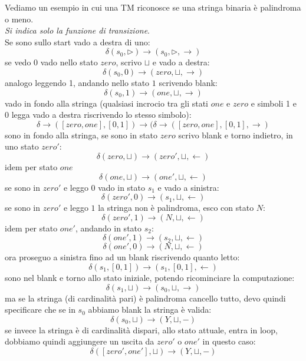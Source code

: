 \begin{esempio}
  Vediamo un esempio in cui una TM riconosce se una stringa binaria è
  palindroma o meno.\\
  \textit{Si indica solo la funzione di transizione}.\\
  Se sono sullo start vado a destra di uno:
  \[\delta(s_0,\triangleright)\to (s_0,\triangleright, \rightarrow)\]
  se vedo 0 vado nello stato $zero$, scrivo $\sqcup$ e vado a destra:
  \[\delta(s_0,0)\to (zero,\sqcup, \rightarrow)\]
  analogo leggendo 1, andando nello stato $1$ scrivendo blank:
  \[\delta(s_0,1)\to (one,\sqcup, \rightarrow)\]
  vado in fondo alla stringa (qualsiasi incrocio tra gli stati $one$ e $zero $ e
  simboli 1 e 0 legga vado a destra riscrivendo lo stesso simbolo):
  \[\delta\to([zero, one],[0,1])\to(\delta\to([zero, one],[0,1],\rightarrow)\]
  sono in fondo alla stringa, se sono in stato $zero$ scrivo blank e torno
  indietro, in uno stato $zero'$:
  \[\delta(zero, \sqcup)\to(zero', \sqcup, \leftarrow)\]
  idem per stato $one$
  \[\delta(one, \sqcup)\to(one', \sqcup, \leftarrow)\]
  se sono in $zero'$ e leggo $0$ vado in stato $s_1$ e vado a sinistra: 
  \[\delta(zero', 0)\to(s_1,\sqcup, \leftarrow)\]
  se sono in $zero'$ e leggo $1$ la stringa non è palindroma, esco con stato
  $N$:
  \[\delta(zero', 1)\to(N,\sqcup, \leftarrow)\]
  idem per stato $one'$, andando in stato $s_2$:
  \[\delta(one', 1)\to(s_2,\sqcup, \leftarrow)\]
  \[\delta(one', 0)\to(N,\sqcup, \leftarrow)\]
  ora proseguo a sinistra fino ad un blank riscrivendo quanto letto:
  \[\delta(s_1,[0,1])\to(s_1,[0,1], \leftarrow)\]
  sono nel blank e torno allo stato iniziale, potendo ricominciare la
  computazione:
  \[\delta(s_1,\sqcup)\to(s_0,\sqcup, \rightarrow)\]
  ma se la stringa (di cardinalità pari) è palindroma cancello tutto, devo
  quindi specificare che se in $s_0$ abbiamo blank la stringa è valida:
  \[\delta(s_0,\sqcup)\to(Y, \sqcup,-)\]
  se invece la stringa è di cardinalità dispari, allo stato attuale, entra in
  loop, dobbiamo quindi aggiungere un uscita da $zero'$ o $one'$ in questo
  caso:
  \[\delta([zero',one'], \sqcup)\to(Y, \sqcup, -)\]
\end{esempio}
